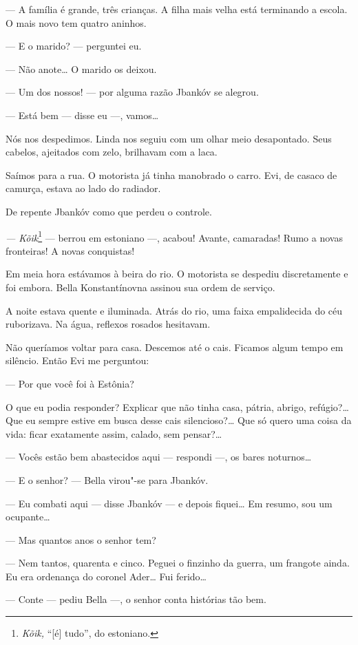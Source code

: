 --- A família é grande, três crianças. A filha mais velha está
terminando a escola. O mais novo tem quatro aninhos.

--- E o marido? --- perguntei eu.

--- Não anote\ldots{} O marido os deixou.

--- Um dos nossos! --- por alguma razão Jbankóv se
alegrou.

--- Está bem --- disse eu ---, vamos\ldots{}

Nós nos despedimos. Linda nos seguiu com um olhar meio desapontado. Seus
cabelos, ajeitados com zelo, brilhavam com a laca.

Saímos para a rua. O motorista já tinha manobrado o carro. Evi, de
casaco de camurça, estava ao lado do radiador.

De repente Jbankóv como que perdeu o controle.

\emph{--- Kõik}\footnote{\emph{Kõik,} ``{[}é{]} tudo'', do estoniano.}
--- berrou em estoniano ---, acabou! Avante, camaradas!
Rumo a novas fronteiras! A novas conquistas!

Em meia hora estávamos à beira do rio. O motorista se despediu
discretamente e foi embora. Bella Konstantínovna assinou sua ordem de
serviço.

A noite estava quente e iluminada. Atrás do rio, uma faixa empalidecida
do céu ruborizava. Na água, reflexos rosados hesitavam.

Não queríamos voltar para casa. Descemos até o cais. Ficamos algum tempo
em silêncio. Então Evi me perguntou:

--- Por que você foi à Estônia?

O que eu podia responder? Explicar que não tinha casa, pátria, abrigo,
refúgio?\ldots{} Que eu sempre estive em busca desse cais silencioso?\ldots{} Que
só quero uma coisa da vida: ficar exatamente assim, calado, sem
pensar?\ldots{}

--- Vocês estão bem abastecidos aqui --- respondi
---, os bares noturnos\ldots{}

--- E o senhor? --- Bella virou"-se para Jbankóv.

--- Eu combati aqui --- disse Jbankóv --- e depois
fiquei\ldots{} Em resumo, sou um ocupante\ldots{}

--- Mas quantos anos o senhor tem?

--- Nem tantos, quarenta e cinco. Peguei o finzinho da guerra, um
frangote ainda. Eu era ordenança do coronel Ader\ldots{} Fui ferido\ldots{}

--- Conte --- pediu Bella ---, o senhor conta
histórias tão bem.

